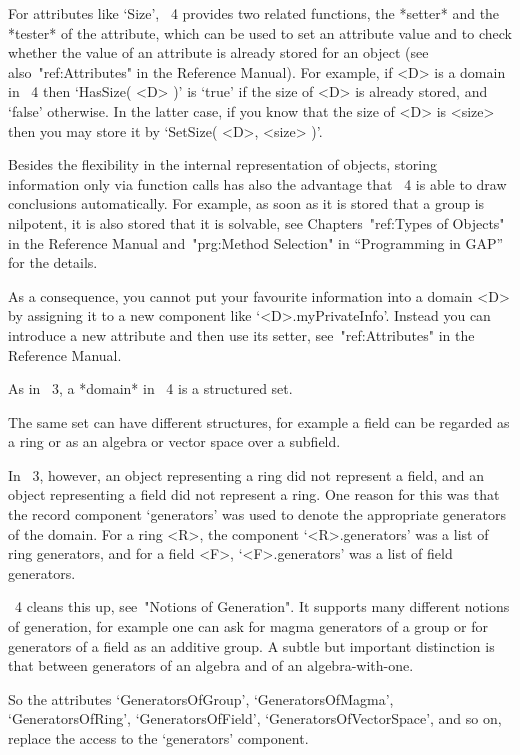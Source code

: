 For attributes like `Size', {\GAP}~4 provides two related functions,
the *setter* and the *tester* of the attribute, which can be used to
set an attribute value and to check whether the value of an attribute
is already stored for an object (see also~"ref:Attributes" in the
Reference Manual).  For example, if <D> is a domain in {\GAP}~4 then
`HasSize( <D> )' is `true' if the size of <D> is already stored, and
`false' otherwise.  In the latter case, if you know that the size of
<D> is <size> then you may store it by `SetSize( <D>, <size> )'.

Besides the flexibility in the internal representation of objects,
storing information only via function calls has also the advantage
that {\GAP}~4 is able to draw conclusions automatically.  For example,
as soon as it is stored that a group is nilpotent, it is also stored
that it is solvable, see Chapters~"ref:Types of Objects" in the
Reference Manual and~"prg:Method Selection" in ``Programming in GAP''
for the details.

As a consequence, you cannot put your favourite information into a
domain <D> by assigning it to a new component like
`<D>.myPrivateInfo'.  Instead you can introduce a new attribute and
then use its setter, see~"ref:Attributes" in the Reference Manual.



As in {\GAP}~3, a *domain* in {\GAP}~4 is a structured set.

The same set can have different structures, for example a field can be
regarded as a ring or as an algebra or vector space over a subfield.

In {\GAP}~3, however, an object representing a ring did not represent
a field, and an object representing a field did not represent a ring.
One reason for this was that the record component `generators' was
used to denote the appropriate generators of the domain.  For a ring
<R>, the component `<R>.generators' was a list of ring generators, and
for a field <F>, `<F>.generators' was a list of field generators.

{\GAP}~4 cleans this up, see~"Notions of Generation".  It supports
many different notions of generation, for example one can ask for
magma generators of a group or for generators of a field as an additive
group.  A subtle but important distinction is that between generators
of an algebra and of an algebra-with-one.

So the attributes `GeneratorsOfGroup', `GeneratorsOfMagma',
`GeneratorsOfRing', `GeneratorsOfField', `GeneratorsOfVectorSpace',
and so on, replace the access to the `generators' component.


